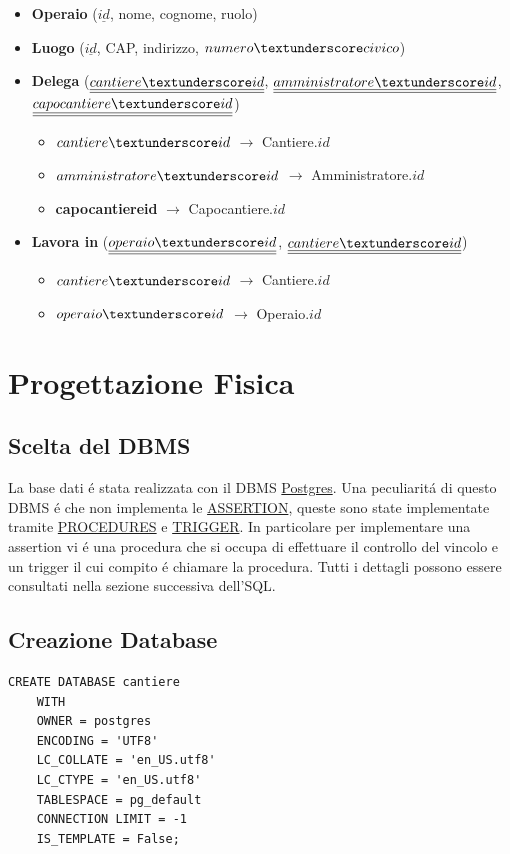 \documentclass[11pt]{article}
\begin{document}
\begin{itemize}
\item \textbf{Operaio} (\textbf{\(\underline{id}\)}, nome, cognome, ruolo)
\item \textbf{Luogo} (\textbf{\(\underline{id}\)}, CAP, indirizzo, \(numero\textunderscore civico\))
\item \textbf{Delega} (\(\underline{\underline{cantiere\textunderscore id}}\), \(\underline{\underline{amministratore\textunderscore id}}\), \(\underline{\underline{capocantiere\textunderscore id}}\))
\begin{itemize}
\item \textbf{\(cantiere\textunderscore id\)} \(\rightarrow\) Cantiere.\(id\)
\item \textbf{\(amministratore\textunderscore id\)} \(\rightarrow\) Amministratore.\(id\)
\item \textbf{capocantiere\textunderscore id} \(\rightarrow\) Capocantiere.\(id\)
\end{itemize}
\item \textbf{Lavora in}  (\(\underline{\underline{operaio\textunderscore id}}\), \(\underline{\underline{cantiere\textunderscore id}}\))
\begin{itemize}
\item \textbf{\(cantiere\textunderscore id\)} \(\rightarrow\) Cantiere.\(id\)
\item \textbf{\(operaio\textunderscore id\)} \(\rightarrow\) Operaio.\(id\)
\end{itemize}
\end{itemize}
\section*{Progettazione Fisica}
\label{sec:org8d6a1aa}
\subsection*{Scelta del DBMS}
\label{sec:orga90631d}
La base dati é stata realizzata con il DBMS \href{https://www.postgresql.org/}{Postgres}.
Una peculiaritá di questo DBMS é che non implementa le \uline{ASSERTION}, queste sono state implementate tramite \uline{PROCEDURES} e \uline{TRIGGER}.
In particolare per implementare una assertion vi é una procedura che si occupa di effettuare il controllo del vincolo e un trigger il cui compito é chiamare la procedura.
Tutti i dettagli possono essere consultati nella sezione successiva dell'SQL.
\subsection*{Creazione Database}
\label{sec:org29b63f4}
\begin{verbatim}
CREATE DATABASE cantiere
    WITH
    OWNER = postgres
    ENCODING = 'UTF8'
    LC_COLLATE = 'en_US.utf8'
    LC_CTYPE = 'en_US.utf8'
    TABLESPACE = pg_default
    CONNECTION LIMIT = -1
    IS_TEMPLATE = False;
\end{verbatim}
\end{document}
